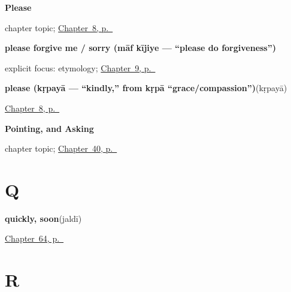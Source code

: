 \noindent\begin{minipage}[t]{\linewidth}
\raggedright
\textbf{Please}\par
\footnotesize chapter topic; \hyperref[ch:hi-please]{Chapter~8, p.~\pageref*{ch:hi-please}}
\end{minipage}\par\smallskip

\noindent\begin{minipage}[t]{\linewidth}
\raggedright
\textbf{please forgive me / sorry (māf kījiye — \textquotedblleft{}please do forgiveness\textquotedblright{})}\enspace\emph{ }\par
\footnotesize explicit focus: etymology; \hyperref[ch:hi-sorry]{Chapter~9, p.~\pageref*{ch:hi-sorry}}
\end{minipage}\par\smallskip

\noindent\begin{minipage}[t]{\linewidth}
\raggedright
\textbf{please (kṛpayā — \textquotedblleft{}kindly,\textquotedblright{} from kṛpā \textquotedblleft{}grace/compassion\textquotedblright{})}\enspace\emph{}\enspace(kṛpayā)\par
\footnotesize \hyperref[ch:hi-please]{Chapter~8, p.~\pageref*{ch:hi-please}}
\end{minipage}\par\smallskip

\noindent\begin{minipage}[t]{\linewidth}
\raggedright
\textbf{Pointing, and Asking}\par
\footnotesize chapter topic; \hyperref[ch:hi-pointing-and-asking]{Chapter~40, p.~\pageref*{ch:hi-pointing-and-asking}}
\end{minipage}\par\smallskip

\section*{Q}

\noindent\begin{minipage}[t]{\linewidth}
\raggedright
\textbf{quickly, soon}\enspace\emph{}\enspace(jaldī)\par
\footnotesize \hyperref[ch:hi-how-much-and-how-fast]{Chapter~64, p.~\pageref*{ch:hi-how-much-and-how-fast}}
\end{minipage}\par\smallskip

\section*{R}

